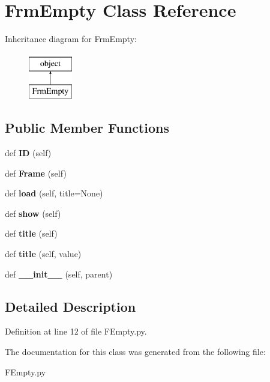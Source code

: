 \hypertarget{class_f_empty_1_1_frm_empty}{}\section{Frm\+Empty Class Reference}
\label{class_f_empty_1_1_frm_empty}
Inheritance diagram for Frm\+Empty\+:\begin{figure}[H]
\begin{center}
\leavevmode
\includegraphics[height=2.000000cm]{class_f_empty_1_1_frm_empty}
\end{center}
\end{figure}
\subsection*{Public Member Functions}
\begin{DoxyCompactItemize}
\item 
\mbox{\label{class_f_empty_1_1_frm_empty_adb8818239148d2e5c5833a2b062ee9ad}} 
def {\bfseries ID} (self)
\item 
\mbox{\label{class_f_empty_1_1_frm_empty_acf44064249ee17c3e8952b4c33512f86}} 
def {\bfseries Frame} (self)
\item 
\mbox{\label{class_f_empty_1_1_frm_empty_ab83ff91f3f9776b4af9b931631e73091}} 
def {\bfseries load} (self, title=None)
\item 
\mbox{\label{class_f_empty_1_1_frm_empty_ab4f4398c3f210fe4ea6e720401357691}} 
def {\bfseries show} (self)
\item 
\mbox{\label{class_f_empty_1_1_frm_empty_a955a7cdca50525c17f86368cb44b1039}} 
def {\bfseries title} (self)
\item 
\mbox{\label{class_f_empty_1_1_frm_empty_a9e6a9fff264031ba43ff34c096154972}} 
def {\bfseries title} (self, value)
\item 
\mbox{\label{class_f_empty_1_1_frm_empty_a75020e7f3888d6f837fae592b305add8}} 
def {\bfseries \+\_\+\+\_\+init\+\_\+\+\_\+} (self, parent)
\end{DoxyCompactItemize}


\subsection{Detailed Description}


Definition at line 12 of file F\+Empty.\+py.



The documentation for this class was generated from the following file\+:\begin{DoxyCompactItemize}
\item 
F\+Empty.\+py\end{DoxyCompactItemize}
